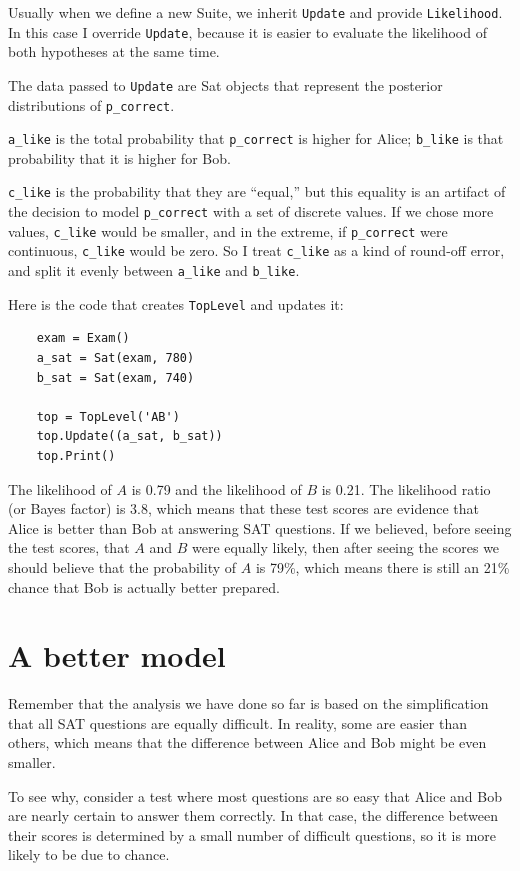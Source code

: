 \documentclass[12pt]{book}
\begin{document}
Usually when we define a new Suite, we inherit {\tt Update}
and provide {\tt Likelihood}.  In this case I override {\tt Update},
because it is easier to evaluate the likelihood of both
hypotheses at the same time.

The data passed to {\tt Update} are Sat objects that represent
the posterior distributions of \verb"p_correct".

\verb"a_like" is the total probability that
\verb"p_correct" is higher for Alice; \verb"b_like" is that
probability that it is higher for Bob.

\verb"c_like" is the probability that they are ``equal,'' but this
equality is an artifact of the decision to model \verb"p_correct" with
a set of discrete values.  If we chose more values, \verb"c_like"
would be smaller, and in the extreme, if \verb"p_correct" were
continuous, \verb"c_like" would be zero.  So I treat \verb"c_like" as
a kind of round-off error, and split it evenly between \verb"a_like"
and \verb"b_like".

Here is the code that creates {\tt TopLevel} and updates it:

\begin{verbatim}
    exam = Exam()
    a_sat = Sat(exam, 780)
    b_sat = Sat(exam, 740)

    top = TopLevel('AB')
    top.Update((a_sat, b_sat))
    top.Print()
\end{verbatim}

The likelihood of $A$ is 0.79 and the likelihood of $B$ is 0.21.  The
likelihood ratio (or Bayes factor) is 3.8, which means that these test
scores are evidence that Alice is better than Bob at answering SAT
questions.  If we believed, before seeing the test scores, that $A$
and $B$ were equally likely, then after seeing the scores we should
believe that the probability of $A$ is 79\%, which means there is
still an 21\% chance that Bob is actually better prepared.


\section{A better model}

Remember that the analysis we have done so far is based on
the simplification that all SAT questions are equally difficult.
In reality, some are easier than others, which means that the
difference between Alice and Bob might be even smaller.

To see why, consider a test where most questions are so easy that
Alice and Bob are nearly certain to answer them correctly.  In that
case, the difference between their scores is determined by a small
number of difficult questions, so it is more likely to be due to
chance.
\end{document}
